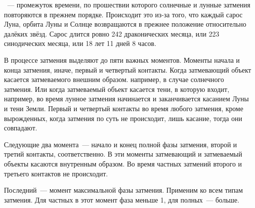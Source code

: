 ~--- промежуток  времени, по прошествии которого солнечные и лунные затмения повторяются в прежнем порядке. Происходит это из-за того, что каждый сарос Луна, орбита Луны и Солнце возвращаются в прежнее положение относительно далёких звёзд. Сарос длится ровно 242 драконических месяца, или 223 синодических месяца, или 18 лет 11 дней 8 часов.

В процессе затмения выделяют до пяти важных моментов. Моменты начала и конца затмения, иначе, первый и четвертый контакты. Когда затмевающий объект касается затмеваемого внешним образом. например, в случае солнечного затмения. Или когда затмеваемый объект касается тени, в которую входит, например, во время лунное затмения начинается и заканчивается касанием Луны и тени Земли. Первый и четвертый контакты во время любого затмения, кроме вырожденных, когда затмения по суть не происходит, лишь касание, тогда они совпадают.

Следующие два момента~--- начало и конец полной фазы затмения, второй и третий контакты, соответственно. В эти моменты затмевающий и затмеваемый объекты касаются внутренным образом. Во время частных затмений второго и третьего контактов не происходит.

Последний~--- момент максимальной фазы затмения. Применим ко всем типам затмения. Для частных в этот момент фаза меньше 1, для полных~--- больше.


